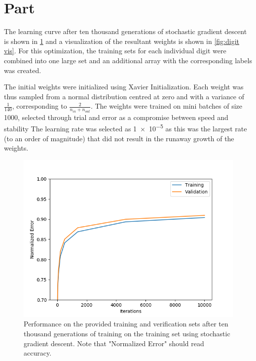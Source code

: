 \documentclass{article}
\newcommand{\enterproblemHeader}[1]{
}
\newcommand{\exitproblemHeader}[1]{
}
\newcounter{problem} %
\newcommand{\problemName}{}
\newenvironment{problem}[1][Part \theproblem]{ %
	\stepcounter{problem} %
	\renewcommand{\problemName}{#1} %
	\section{\problemName} %
	\enterproblemHeader{\problemName} %
}{
	\exitproblemHeader{\problemName} %
}
\begin{document}
\FloatBarrier
\begin{problem}
	The learning curve after ten thousand generations of stochastic gradient descent is shown in \cref{fig:learn curve} and a visualization of the resultant weights is shown in \cref{fig:digit vis}. For this optimization, the training sets for each individual digit were combined into one large set and an additional array with the corresponding labels was created. 
	
	The initial weights were initialized using Xavier Initialization. Each weight was thus sampled from a normal distribution centred at zero and with a variance of \(\frac{1}{140}\), corresponding to \(\frac{2}{n_{in} + n_{out}}\). The weights were trained on mini batches of size 1000, selected through trial and error as a compromise between speed and stability The learning rate was selected as \num{1e-5} as this was the largest rate (to an order of magnitude) that did not result in the runaway growth of the weights. 

\begin{figure}
	\includegraphics[width=\linewidth]{learning_rate}
	\caption{Performance on the provided training and verification sets after ten thousand generations of training on the training set using stochastic gradient descent. Note that "Normalized Error" should read accuracy.}
	\label{fig:learn curve}
\end{figure}


\end{problem}
\end{document}
